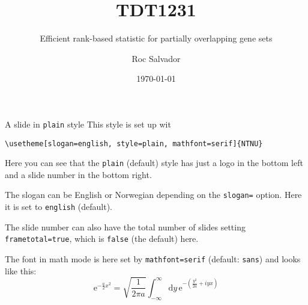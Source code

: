 \documentclass[aspectratio=169]{beamer}
\title{TDT1231}
\subtitle{Efficient rank-based statistic for partially overlapping gene sets}
\author{Roc Salvador}
\date{\today}
\begin{document}
	\maketitle
    \begin{frame}[fragile]{A slide in \texttt{plain} style}
        This style is set up wit

        \lstinline!\usetheme[slogan=english, style=plain, mathfont=serif]{NTNU}!

        Here you can see that the \texttt{plain} (default) style has just a logo in the bottom left and a slide number in the bottom right.

        The slogan can be English or Norwegian depending on the \lstinline!slogan=! option. Here it is set to \lstinline!english! (default).

        The slide number can also have the total number of slides setting \lstinline!frametotal=true!, which is \lstinline!false! (the default) here.
        
        The font in math mode is here set by \lstinline!mathfont=serif! (default: \lstinline!sans!) and looks like this: \[\mathrm{e}^{-\frac{a}{2}x^2} = \sqrt{\frac{1}{2\pi a}} \int_{-\infty}^\infty\mathrm{d}y\, \mathrm{e}^{-\left(\frac{y^2}{2a} +iy x\right)}\]
    \end{frame}
\end{document}

